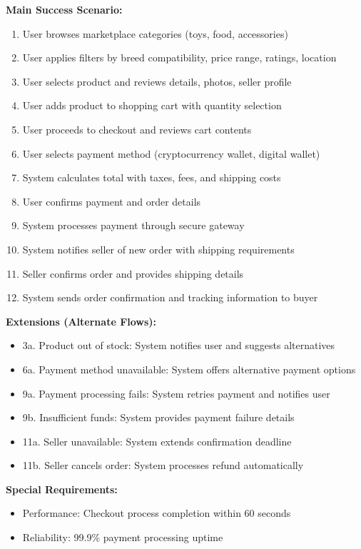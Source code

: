 \textbf{Main Success Scenario:}
\begin{enumerate}
    \item User browses marketplace categories (toys, food, accessories)
    \item User applies filters by breed compatibility, price range, ratings, location
    \item User selects product and reviews details, photos, seller profile
    \item User adds product to shopping cart with quantity selection
    \item User proceeds to checkout and reviews cart contents
    \item User selects payment method (cryptocurrency wallet, digital wallet)
    \item System calculates total with taxes, fees, and shipping costs
    \item User confirms payment and order details
    \item System processes payment through secure gateway
    \item System notifies seller of new order with shipping requirements
    \item Seller confirms order and provides shipping details
    \item System sends order confirmation and tracking information to buyer
\end{enumerate}

\textbf{Extensions (Alternate Flows):}
\begin{itemize}
    \item 3a. Product out of stock: System notifies user and suggests alternatives
    \item 6a. Payment method unavailable: System offers alternative payment options
    \item 9a. Payment processing fails: System retries payment and notifies user
    \item 9b. Insufficient funds: System provides payment failure details
    \item 11a. Seller unavailable: System extends confirmation deadline
    \item 11b. Seller cancels order: System processes refund automatically
\end{itemize}

\textbf{Special Requirements:}
\begin{itemize}

    \item Performance: Checkout process completion within 60 seconds
    \item Reliability: 99.9\% payment processing uptime

\end{itemize}

